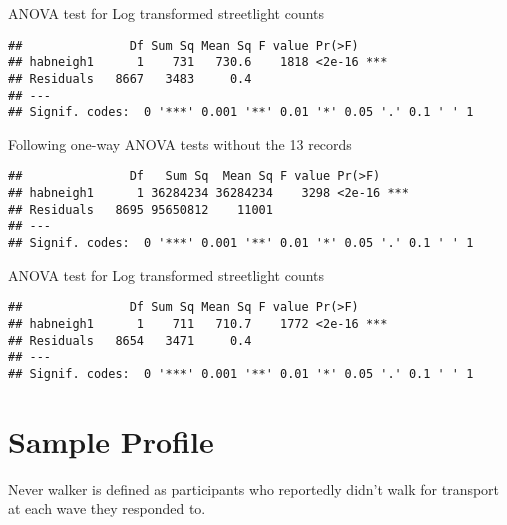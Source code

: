 \documentclass[
]{book}
\begin{document}
ANOVA test for Log transformed streetlight counts

\begin{verbatim}
##               Df Sum Sq Mean Sq F value Pr(>F)    
## habneigh1      1    731   730.6    1818 <2e-16 ***
## Residuals   8667   3483     0.4                   
## ---
## Signif. codes:  0 '***' 0.001 '**' 0.01 '*' 0.05 '.' 0.1 ' ' 1
\end{verbatim}

Following one-way ANOVA tests without the 13 records

\begin{verbatim}
##               Df   Sum Sq  Mean Sq F value Pr(>F)    
## habneigh1      1 36284234 36284234    3298 <2e-16 ***
## Residuals   8695 95650812    11001                   
## ---
## Signif. codes:  0 '***' 0.001 '**' 0.01 '*' 0.05 '.' 0.1 ' ' 1
\end{verbatim}

ANOVA test for Log transformed streetlight counts

\begin{verbatim}
##               Df Sum Sq Mean Sq F value Pr(>F)    
## habneigh1      1    711   710.7    1772 <2e-16 ***
## Residuals   8654   3471     0.4                   
## ---
## Signif. codes:  0 '***' 0.001 '**' 0.01 '*' 0.05 '.' 0.1 ' ' 1
\end{verbatim}

\hypertarget{sample-profile}{%
\chapter{Sample Profile}\label{sample-profile}}

Never walker is defined as participants who reportedly didn't walk for transport at each wave they responded to.
\end{document}
